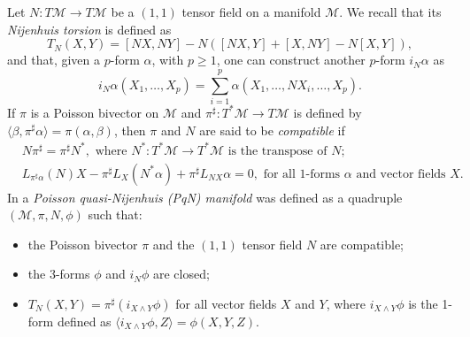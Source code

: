 \documentclass[12pt]{article}
\def\M{{\mathcal M}}
\begin{document}
Let $N:T\M\to T\M$ be a $(1,1)$ tensor field on a manifold $\M$. We recall that its {\it Nijenhuis torsion\/} is defined as 
\begin{equation}
\label{tndef1}
T_N(X,Y)=[NX,NY]-N\left([NX,Y]+[X,NY]-N[X,Y]\right),
\end{equation}
and that, given a $p$-form $\alpha$, with $p\ge 1$, one can construct another $p$-form $i_N\alpha$ as \begin{equation}
\label{iNalpha}
i_N\alpha(X_1,\dots,X_p)=\sum_{i=1}^p \alpha(X_1,\dots,NX_i,\dots,X_p).
\end{equation}
If $\pi$ is a Poisson bivector on $\M$ and $\pi^\sharp:T^*\M\to T\M$ is defined by $\langle \beta,\pi^\sharp\alpha\rangle=\pi(\alpha,\beta)$, then 
$\pi$ and $N$ are said to be {\it compatible\/} \cite{MagriMorosiRagnisco85} if 
\begin{equation}
\label{N-P-compatible}
\begin{split}
&N\pi^\sharp=\pi^\sharp N^*,\,\,
\mbox{where $N^*:T^*\M\to T^*\M$ is the transpose of $N$;}\\
&L_{\pi^\sharp\alpha}(N) X-\pi^\sharp%
L_{X}(N^*\alpha)+\pi^\sharp%
L_{NX}\alpha=0,\,\,\mbox{for all 1-forms $\alpha$ and vector fields $X$.}
\end{split}
\end{equation}
In \cite{SX} a {\it Poisson quasi-Nijenhuis (PqN) manifold\/} was defined as a quadruple $(\M,\pi,N,\phi)$ such that:
\begin{itemize}
\item the Poisson bivector $\pi$ and the $(1,1)$ tensor field $N$  
are compatible;
\item the 3-forms $\phi$ and $i_N\phi$ are closed;
\item $T_N(X,Y)=\pi^\sharp\left(i_{X\wedge Y}\phi\right)$ for all vector fields $X$ and $Y$, where $i_{X\wedge Y}\phi$ is the 1-form defined as $\langle i_{X\wedge Y}\phi,Z\rangle=\phi(X,Y,Z)$.
\end{itemize}
\end{document}
